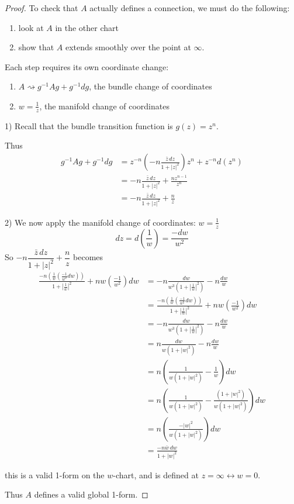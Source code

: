 \documentclass[main]{subfiles}
\begin{document}
\begin{proof}
To check that $A$ actually defines a connection, we must do the following:
\begin{enumerate}
	\item look at $A$ in the other chart
	\item show that $A$ extends smoothly over the point at $\infty$.
\end{enumerate}
Each step requires its own coordinate change:
\begin{enumerate}
	\item $A \rightsquigarrow g^{-1}Ag + g^{-1}dg$, the bundle change of coordinates
	\item  $w = \frac{1}{z}$, the manifold change of coordinates
\end{enumerate}

1) Recall that the bundle transition function is $g(z) = z^n$.

Thus
\begin{align*}
g^{-1}Ag + g^{-1}dg &= z^{-n}\left(-n\frac{\bar z\,dz}{1+|z|^2}\right)z^n + z^{-n}d(z^n) \\
&= -n\frac{\bar z\,dz}{1+|z|^2} + \frac{nz^{n-1}}{z^n} \\
&= -n\frac{\bar z\,dz}{1+|z|^2} + \frac{n}{z}
\end{align*}

2) We now apply the manifold change of coordinates: $w = \frac1z$
\[
dz = d\left(\frac1w\right) = \frac{-dw}{w^2}
\]
So $-n\dfrac{\bar z\,dz}{1+|z|^2} + \dfrac{n}{z}$ becomes
\begin{align*}
\frac{-n\left(\frac1w\left(\frac{-1}{w^2}dw\right)\right)}{1+\left|\frac1w\right|^2} + nw\left(\frac{-1}{w^2}\right)dw &= -n\frac{dw}{w^3\left(1+\left|\frac1w\right|^2\right)} - n\frac{dw}{w} \\
&=\frac{-n\left(\frac1w\left(\frac{-1}{w^2}dw\right)\right)}{1+\left|\frac1w\right|^2} + nw\left(\frac{-1}{w^2}\right)dw \\
&= -n\frac{dw}{w^3\left(1+\left|\frac1w\right|^2\right)} - n\frac{dw}{w} \\
&= n\frac{dw}{w(1+|w|^2)} - n\frac{dw}{w} \\
&= n\left(\frac{1}{w(1+|w|^2)} - \frac1w\right)dw \\
&= n\left(\frac{1}{w(1+|w|^2)} - \frac{(1+|w|^2)}{w(1+|w|^2)}\right)dw\\
&= n\left(\frac{-|w|^2}{w(1+|w|^2)}\right)dw\\
&= \frac{-n\bar w\,dw}{1+|w|^2}
\end{align*}

this is a valid 1-form on the $w$-chart, and is defined at $z=\infty \leftrightarrow w=0$.

Thus $A$ defines a valid global 1-form.
\end{proof}
\end{document}
